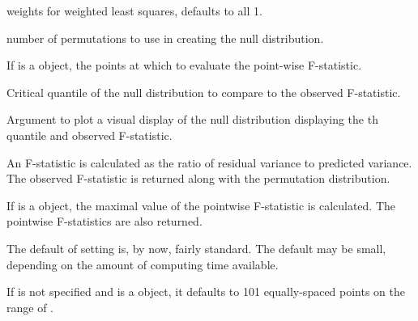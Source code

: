 \begin{Arguments}
\begin{ldescription}
\item[\code{wt}] weights for weighted least squares, defaults to all 1.

\item[\code{nperm}] number of permutations to use in creating the null distribution.

\item[\code{argvals}] If  is a  object, the points at which to evaluate
the point-wise F-statistic.

\item[\code{q}] Critical quantile of the null distribution to compare to the observed
F-statistic.

\item[\code{plotres}] Argument to plot a visual display of the null distribution displaying the
th quantile and observed F-statistic.

\end{ldescription}
\end{Arguments}
\begin{Details}\relax
An F-statistic is calculated as the ratio of residual variance to predicted
variance. The observed F-statistic is returned along with the permutation
distribution.

If  is a  object, the maximal value of the pointwise
F-statistic is calculated. The pointwise F-statistics are also returned.

The default of setting  is, by now, fairly standard. The default
 may be small, depending on the amount of computing time available.

If  is not specified and  is a  object,
it defaults to 101 equally-spaced points on the range of .
\end{Details}
